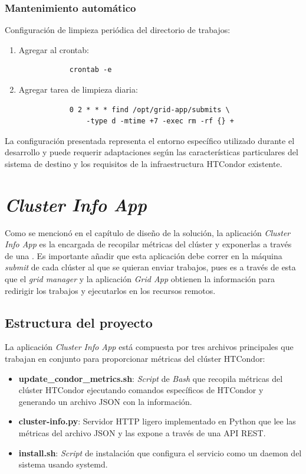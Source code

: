 \subsubsection{Mantenimiento automático}
\noindent

Configuración de limpieza periódica del directorio de trabajos:

\begin{enumerate}
	\item Agregar al crontab:
	      \begin{verbatim}
			crontab -e
		\end{verbatim}
	
	\item Agregar tarea de limpieza diaria:
	      \begin{verbatim}
			0 2 * * * find /opt/grid-app/submits \
				-type d -mtime +7 -exec rm -rf {} +
		\end{verbatim}
\end{enumerate}

La configuración presentada representa el entorno específico utilizado durante el desarrollo y puede requerir adaptaciones según las características particulares del sistema de destino y los requisitos de la infraestructura HTCondor existente.

\section{\textit{Cluster Info App}}
\noindent

Como se mencionó en el capítulo de diseño de la solución, la aplicación \textit{Cluster Info App} es la encargada de recopilar métricas del clúster y exponerlas a través de una \API. Es importante añadir que esta aplicación debe correr en la máquina \textit{submit} de cada clúster al que se quieran enviar trabajos, pues es a través de esta que el \textit{grid manager} y la aplicación \textit{Grid App} obtienen la información para redirigir los trabajos y ejecutarlos en los recursos remotos.

\subsection{Estructura del proyecto}
\noindent
La aplicación \textit{Cluster Info App} está compuesta por tres archivos principales que trabajan en conjunto para proporcionar métricas del clúster HTCondor:

\begin{itemize}
	\item \textbf{update\_condor\_metrics.sh}: \textit{Script} de \textit{Bash} que recopila métricas del clúster HTCondor ejecutando comandos específicos de HTCondor y generando un archivo JSON con la información.
	\item \textbf{cluster-info.py}: Servidor HTTP ligero implementado en Python que lee las métricas del archivo JSON y las expone a través de una API REST.
	\item \textbf{install.sh}: \textit{Script} de instalación que configura el servicio como un daemon del sistema usando systemd.
\end{itemize}

